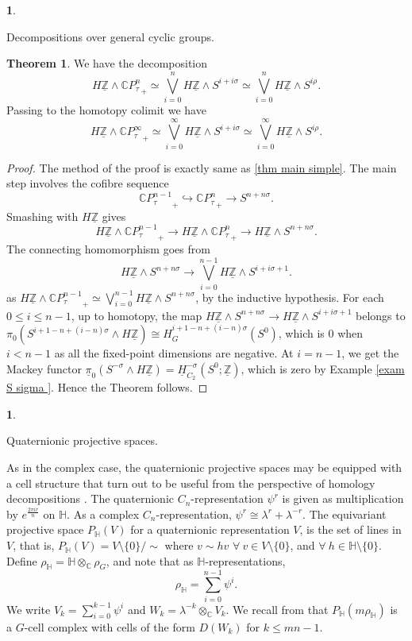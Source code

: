 \documentclass[a4paper,leqno,11pt]{amsart}
\theoremstyle{plain}
\theoremstyle{definition}
\newtheorem{subsec}[theorem]{}
\newtheorem{thm}[theorem]{Theorem}
\theoremstyle{remark}
\theoremstyle{definition}
\newcommand{\C}{{\mathbb C}}
\newcommand{\Hyp}{{\mathbb H}}
\newcommand{\ra}{\rightarrow}
\newenvironment{mysubsection}[2][]
{\begin{subsec}\begin{upshape}\begin{bfseries}{#2.}
			\end{bfseries}{#1}}
		{\end{upshape}\end{subsec}}
\newcommand{\uZ}{\underline{\mathbb{Z}}}
\def\C{\mathbb{C}}
\def\ra{\rightarrow}
\numberwithin{equation}{section}
\newcommand{\smas}{\wedge}
\begin{document}
\begin{mysubsection}{Decompositions over general cyclic groups}
	\begin{thm}\label{prop:cpnconj}
		We have the decomposition 
		$$H\uZ \smas {\C P_{\tau}^{n}}_+  \simeq \bigvee_{i=0}^{n}H\uZ\smas S^{i+i\sigma }\simeq \bigvee_{i=0}^{n}H\uZ\smas S^{i\rho}.$$ 
		Passing to the homotopy colimit we have 
		$$H\uZ \smas {\C P_{\tau}^{\infty}}_+  \simeq \bigvee_{i=0}^{\infty}H\uZ\smas S^{i+i \sigma }\simeq \bigvee_{i=0}^{\infty}H\uZ\smas S^{i\rho}.$$
	\end{thm}
	
	\begin{proof}
		The method of the proof is exactly same as \ref{thm main simple}. The main step involves the cofibre sequence 
		$$ {\C P_{\tau}^{n-1}}_+  \hookrightarrow  {\C P_{\tau}^{n}}_+  \ra S^{n+n\sigma }.$$
		Smashing with $H\uZ$ gives
		$$ H\uZ\smas{\C P_{\tau}^{n-1}}_+  \ra H\uZ\smas{\C P_{\tau}^{n}}_+  \ra H\uZ\smas S^{n+n\sigma }.$$
		The connecting homomorphism goes from 
		$$H\uZ\smas S^{n+n\sigma}\ra \bigvee_{i=0}^{n-1}H\uZ\smas S^{i+i\sigma +1}.$$  
		as $ H\uZ \smas {\C P_{\tau}^{n-1}}_+  \simeq \bigvee_{i=0}^{n-1}H\uZ\smas S^{n+n \sigma }$, by the inductive hypothesis. For each $0\leq i\leq n-1$, up to homotopy, the map $H\uZ\smas S^{n+n\sigma}\ra H\uZ\smas S^{i+i\sigma +1}$ belongs to $\pi_{0}(S^{i+1-n+(i-n)\sigma}\smas H\uZ)\cong H^{{i+1-n+(i-n)\sigma}}_G(S^0)$, which is $0$ when $i<n-1$ as all the fixed-point dimensions are negative.
		 At $i=n-1$, we get the Mackey functor $\underline{\pi}_{0}(S^{-\sigma}\smas H\uZ) = \underline{H}_{C_{2}}^{-\sigma}(S^0;\uZ)$, which is zero by Example \ref{exam S sigma }.
		 Hence the Theorem follows.
	\end{proof}
	\end{mysubsection}	
	
	\begin{mysubsection}{Quaternionic projective spaces}
		As in the complex case, the quaternionic projective spaces may be equipped with a cell structure that turn out to be useful from the perspective of homology decompositions \cite{Chonoles}. The quaternionic $C_n$-representation $\psi^r$ is given as multiplication by $e^{\frac{2\pi ir}{n}}$ on $\mathbb{H}$.  As a complex $C_n$-representation, $\psi^{r} \cong \lambda^{r} + \lambda^{-r}$. The equivariant projective space $P_{\mathbb{H}}(V)$ for a quaternionic representation $V$, is the set of lines in $V$, that is, $P_{\mathbb{H}}(V)= V \setminus \{0\} / \sim$ where $v \sim hv$ $ \forall~ v\in V\setminus \{0\}$, and $ \forall~ h \in \mathbb{H} \setminus \{0\}$. Define $\rho_\Hyp = \Hyp\otimes_\C \rho_G$, and note that as $\Hyp$-representations, 
\[\rho_\Hyp= \sum_{i=0}^{n-1} \psi^i.\]
We write $V_{k}= \sum_{i=0}^{k-1}\psi^i$ and $W_k=\lambda^{-k}\otimes_\C V_k$. We recall from \cite{Chonoles} that $P_\Hyp(m\rho_\Hyp)$ is a $G$-cell complex with cells of the form $D(W_k)$ for $k \leq mn-1$. 
	\end{mysubsection}
	
\end{document}

